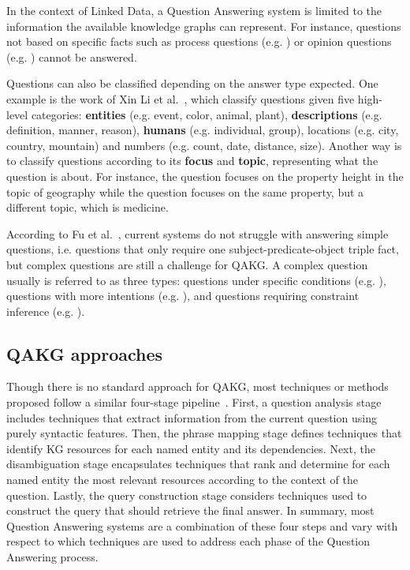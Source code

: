 In the context of Linked Data, a Question Answering system is limited to the information the 
available knowledge graphs can represent. For instance, questions not based on specific facts 
such as process questions (e.g. ) or opinion questions 
(e.g. ) cannot be answered.

Questions can also be classified depending on the answer type expected. One example is the work 
of Xin Li et al.~\cite{qa:LiR02}, which classify questions given five high-level categories: 
\textbf{entities} (e.g. event, color, animal, plant), \textbf{descriptions} (e.g. definition, 
manner, reason), \textbf{humans} (e.g. individual, group), locations (e.g. city, country, 
mountain) and numbers (e.g. count, date, distance, size). Another way is to classify questions 
according to its \textbf{focus} and \textbf{topic}, representing what the question is about. 
For instance, the question  focuses on the 
property height in the topic of geography while the question  focuses on the same property, but a different topic, which is medicine.

According to Fu et al.~\cite{qa:FuQTLYS20abs-2007-13069}, current systems do not struggle with 
answering simple questions, i.e. questions that only require one subject-predicate-object 
triple fact, but complex questions are still a challenge for QAKG. A complex question usually 
is referred to as three types: questions under specific conditions (e.g. ), questions with more intentions (e.g. 
), and questions requiring constraint inference (e.g. ).

\subsection{QAKG approaches}
\label{cap2:theoFrame/qakg/approaches}
Though there is no standard approach for QAKG, most techniques or methods proposed follow a 
similar four-stage pipeline~\cite{qa:core-techniques-DiefenbachLSM18}. First, a question 
analysis stage includes techniques that extract information from the current question using 
purely syntactic features. Then, the phrase mapping stage defines techniques that identify KG 
resources for each named entity and its dependencies. Next, the disambiguation stage 
encapsulates techniques that rank and determine for each named entity the most relevant 
resources according to the context of the question. Lastly, the query construction stage 
considers techniques used to construct the \SPARQL{} query that should retrieve the final answer. 
In summary, most Question Answering systems are a combination of these four steps and vary with 
respect to which techniques are used to address each phase of the Question Answering process.

